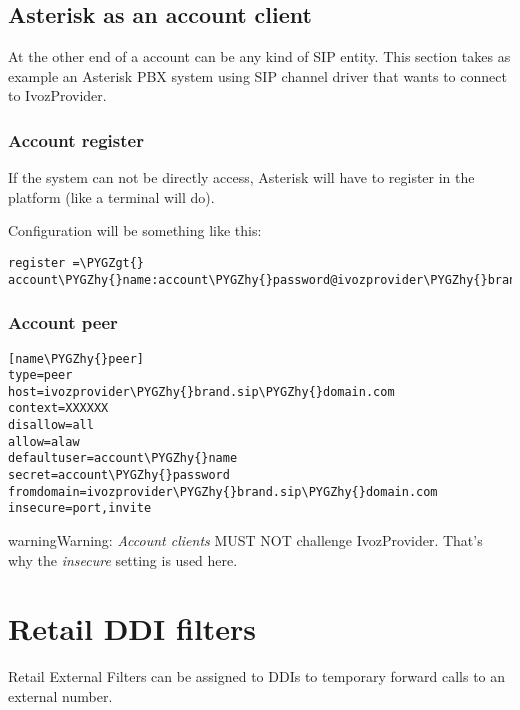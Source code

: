 \documentclass[letterpaper,10pt,english]{sphinxmanual}
\def\PYGZgt{\char`\>}
\def\PYGZhy{\char`\-}
\begin{document}
\subsection{Asterisk as an account client}
\label{retail/accounts:asterisk-as-an-account-client}
At the other end of a account can be any kind of SIP entity. This section takes
as example an Asterisk PBX system using SIP channel driver that wants to connect
to IvozProvider.


\subsubsection{Account register}
\label{retail/accounts:account-register}
If the system can not be directly access, Asterisk will have to register in the
platform (like a terminal will do).

Configuration will be something like this:

\begin{Verbatim}[commandchars=\\\{\}]
register =\PYGZgt{} account\PYGZhy{}name:account\PYGZhy{}password@ivozprovider\PYGZhy{}brand.sip\PYGZhy{}domain.com
\end{Verbatim}


\subsubsection{Account peer}
\label{retail/accounts:account-peer}
\begin{Verbatim}[commandchars=\\\{\}]
[name\PYGZhy{}peer]
type=peer
host=ivozprovider\PYGZhy{}brand.sip\PYGZhy{}domain.com
context=XXXXXX
disallow=all
allow=alaw
defaultuser=account\PYGZhy{}name
secret=account\PYGZhy{}password
fromdomain=ivozprovider\PYGZhy{}brand.sip\PYGZhy{}domain.com
insecure=port,invite
\end{Verbatim}

\begin{notice}{warning}{Warning:}
\emph{Account clients} MUST NOT challenge IvozProvider. That's
why the \emph{insecure} setting is used here.
\end{notice}


\section{Retail DDI filters}
\label{retail/filters:retail-ddi-filters}\label{retail/filters::doc}\label{retail/filters:retail-filters}
Retail External Filters can be assigned to DDIs to temporary
forward calls to an external number.
\end{document}
